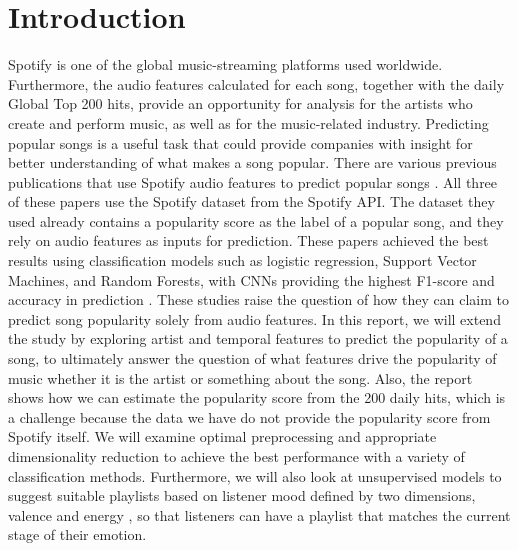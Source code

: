 \documentclass{article}
\begin{document}
\section{Introduction}
Spotify is one of the global music-streaming platforms used worldwide. Furthermore, the audio features calculated for each song, together with the daily Global Top 200 hits, provide an opportunity for analysis for the artists who create and perform music, as well as for the music-related industry. Predicting popular songs is a useful task that could provide companies with insight for better understanding of what makes a song popular. There are various previous publications that use Spotify audio features to predict popular songs \cite{ref1}  \cite{ref2}  \cite{ref3}. All three of these papers use the Spotify dataset from the Spotify API. The dataset they used already contains a popularity score as the label of a popular song, and they rely on audio features as inputs for prediction. These papers achieved the best results using classification models such as logistic regression, Support Vector Machines, and Random Forests, with CNNs providing the highest F1-score and accuracy in prediction \cite{ref4}. These studies raise the question of how they can claim to predict song popularity solely from audio features. In this report, we will extend the study by exploring artist and temporal features to predict the popularity of a song, to ultimately answer the question of what features drive the popularity of music whether it is the artist or something about the song. Also, the report shows how we can estimate the popularity score from the 200 daily hits, which is a challenge because the data we have do not provide the popularity score from Spotify itself. We will examine optimal preprocessing and appropriate dimensionality reduction to achieve the best performance with a variety of classification methods. Furthermore, we will also look at unsupervised models to suggest suitable playlists based on listener mood defined by two dimensions, valence and energy \cite{ref5}, so that listeners can have a playlist that matches the current stage of their emotion.
\end{document}
